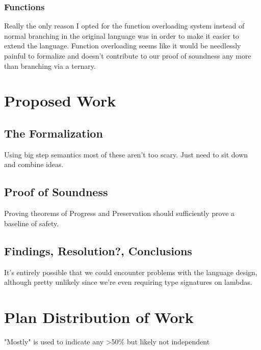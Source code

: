 \documentclass{article}
\begin{document}
\subsubsection{Functions}
Really the only reason I opted for the function overloading system instead of normal branching in the original language was in order to make it easier to extend the language.
Function overloading seems like it would be needlessly painful to formalize and doesn't contribute to our proof of soundness any more than branching via a ternary.

\section{Proposed Work}
\subsection{The Formalization}
Using big step semantics most of these aren't too scary. Just need to sit down and combine ideas.

\subsection{Proof of Soundness}
Proving theorems of Progress and Preservation should sufficiently prove a baseline of safety.

\subsection{Findings, Resolution?, Conclusions}
It's entirely possible that we could encounter problems with the language design, although pretty unlikely since we're even requiring type signatures on lambdas.

\section{Plan Distribution of Work}
"Mostly" is used to indicate any >50\% but likely not independent
\end{document}
